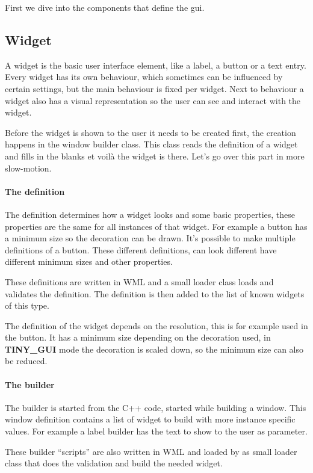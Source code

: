 First we dive into the components that define the gui.

\subsection{Widget}

A widget is the basic user interface element, like a label, a button or a text
entry. Every widget has its own behaviour, which sometimes can be influenced by
certain settings, but the main behaviour is fixed per widget. Next to behaviour
a widget also has a visual representation so the user can see and interact with
the widget.

Before the widget is shown to the user it needs to be created first, the
creation happens in the window builder class. This class reads the definition of
a widget and fills in the blanks et voil\`a the widget is there. Let's go over
this part in more slow-motion.

\paragraph{The definition}
The definition determines how a widget looks and some basic properties, these
properties are the same for all instances of that widget. For example a button
has a minimum size so the decoration can be drawn. It's possible to make
multiple definitions of a button. These different definitions, can look
different have different minimum sizes and other properties.

These definitions are written in WML and a small loader class loads and
validates the definition. The definition is then added to the list of known
widgets of this type.

The definition of the widget depends on the resolution, this is for example used
in the button. It has a minimum size depending on the decoration used, in
\textbf{TINY\_GUI} mode the decoration is scaled down, so the minimum size can
also be reduced.

\paragraph{The builder}
The builder is started from the C++ code, started while building a window. This
window definition contains a list of widget to build with more instance specific
values. For example a label builder has the text to show to the user as
parameter.

These builder ``scripts'' are also written in WML and loaded by as small loader
class that does the validation and build the needed widget.

